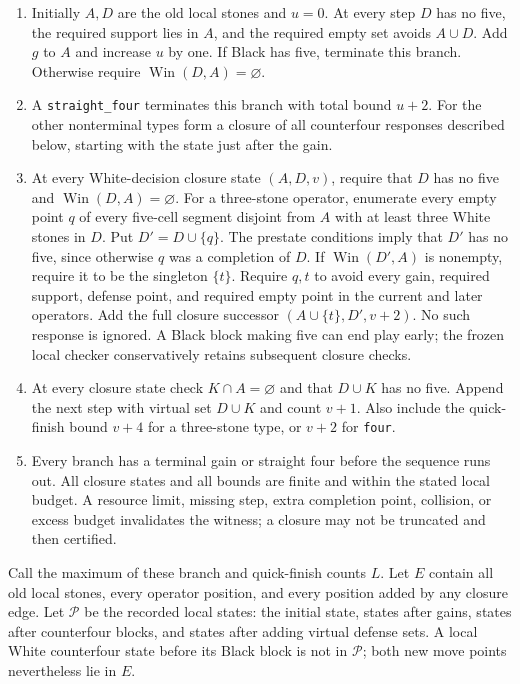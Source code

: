 \documentclass[11pt]{article}
\theoremstyle{definition}
\theoremstyle{remark}
\newcommand{\Win}{\operatorname{Win}}
\begin{document}
\begin{enumerate}
\item Initially \(A,D\) are the old local stones and \(u=0\). At every step \(D\) has no five, the required support lies in \(A\), and the required empty set avoids \(A\cup D\). Add \(g\) to \(A\) and increase \(u\) by one. If Black has five, terminate this branch. Otherwise require \(\Win(D,A)=\varnothing\).
\item A \texttt{straight\_four} terminates this branch with total bound \(u+2\). For the other nonterminal types form a closure of all counterfour responses described below, starting with the state just after the gain.
\item At every White-decision closure state \((A,D,v)\), require that $D$ has no five and \(\Win(D,A)=\varnothing\). For a three-stone operator, enumerate every empty point \(q\) of every five-cell segment disjoint from \(A\) with at least three White stones in \(D\). Put \(D'=D\cup\{q\}\). The prestate conditions imply that $D'$ has no five, since otherwise $q$ was a completion of $D$. If \(\Win(D',A)\) is nonempty, require it to be the singleton \(\{t\}\). Require \(q,t\) to avoid every gain, required support, defense point, and required empty point in the current and later operators. Add the full closure successor \((A\cup\{t\},D',v+2)\). No such response is ignored. A Black block making five can end play early; the frozen local checker conservatively retains subsequent closure checks.
\item At every closure state check \(K\cap A=\varnothing\) and that \(D\cup K\) has no five. Append the next step with virtual set \(D\cup K\) and count \(v+1\). Also include the quick-finish bound \(v+4\) for a three-stone type, or \(v+2\) for \texttt{four}.
\item Every branch has a terminal gain or straight four before the sequence runs out. All closure states and all bounds are finite and within the stated local budget. A resource limit, missing step, extra completion point, collision, or excess budget invalidates the witness; a closure may not be truncated and then certified.

\end{enumerate}
Call the maximum of these branch and quick-finish counts \(L\). Let \(E\) contain all old local stones, every operator position, and every position added by any closure edge. Let \(\mathcal P\) be the recorded local states: the initial state, states after gains, states after counterfour blocks, and states after adding virtual defense sets. A local White counterfour state before its Black block is not in \(\mathcal P\); both new move points nevertheless lie in \(E\).
\end{document}
